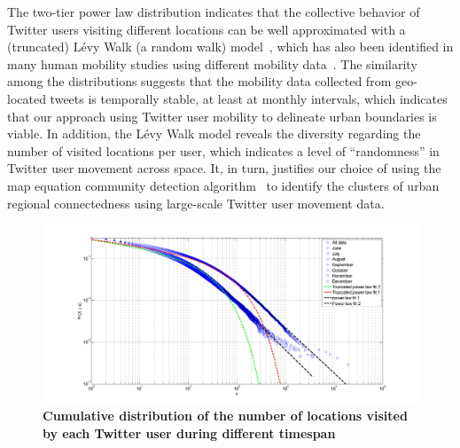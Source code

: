\documentclass[]{tGIS2e}
\begin{document}
The two-tier power law distribution indicates that the collective behavior of Twitter users visiting different locations can be well approximated with a (truncated) L\'{e}vy Walk (a random walk) model~\citep{rhee2011,reynolds2012}, which has also been identified in many human mobility studies using different mobility data~\citep{zhao2015}.
The similarity among the distributions suggests that the mobility data collected from geo-located tweets is temporally stable, at least at monthly intervals, which indicates that our approach using Twitter user mobility to delineate urban boundaries is viable.  
In addition, the L\'{e}vy Walk model reveals the diversity regarding the number of visited locations per user, which indicates a level of ``randomness'' in Twitter user movement across space. 
It, in turn, justifies our choice of using the map equation community detection algorithm~\citep{rosvall2008} to identify the clusters of urban regional connectedness using large-scale Twitter user movement data.

\begin{figure}[ht]
\begin{center}
\includegraphics[width=0.9\linewidth]{./figure/S3_visitation}
\caption{\bfseries{Cumulative distribution of the number of locations visited by each Twitter user during different timespan}}
\label{S3_Fig}
\end{center}
\end{figure}
\end{document}
